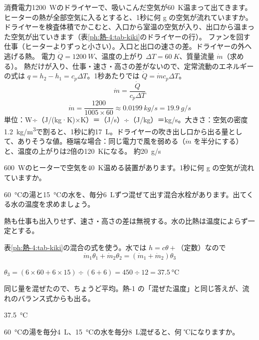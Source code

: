 \begin{phreidai}[ドライヤーを流れる空気の量]
\label{ph:熱-4:ex1}消費電力\qty{1200}{W}のドライヤーで、吸いこんだ空気が\qty{60}{K}温まって出てきます。ヒーターの熱が全部空気に入るとすると、1秒に何 g の空気が流れていますか。
\phbamen
ドライヤーを検査体積でかこむと、入口から室温の空気が入り、出口から温まった空気が出ていきます（表\ref{ph:熱-4:tab-kiki}のドライヤーの行）。
\phmushi
ファンを回す仕事（ヒーターよりずっと小さい）。入口と出口の速さの差。ドライヤーの外へ逃げる熱。
\phzu
電力 $\dot Q=\qty{1200}{W}$、温度の上がり $\Delta T=\qty{60}{K}$、質量流量 $\dot m$（求める）。
\phriyu
熱だけが入り、仕事・速さ・高さの差がないので、定常流動のエネルギーの式は $q=h_2-h_1=c_p\Delta T$。1秒あたりでは $\dot Q=\dot m c_p\Delta T$。
\phtateru
\[ \dot m=\frac{\dot Q}{c_p\Delta T} \]
\phtoku
\[ \dot m=\frac{1200}{1005\times60}\approx\qty{0.0199}{kg/s}=\qty{19.9}{g/s} \]
\phtashikame
単位：W÷（J/(kg·K)×K）＝（J/s）÷（J/kg）＝kg/s。大きさ：空気の密度\qty{1.2}{kg/m^3}で割ると、1秒に約\qty{17}{L}。ドライヤーの吹き出し口から出る量として、ありそうな値。極端な場合：同じ電力で風を弱める（$\dot m$ を半分にする）と、温度の上がりは2倍の\qty{120}{K}になる。
\kotae 約\qty{20}{g/s}
\end{phreidai}
\begin{jibun}
\qty{600}{W}のヒーターで空気を\qty{40}{K}温める装置があります。1秒に何 g の空気が流れていますか。
\end{jibun}

\begin{reidai}[混合水栓の湯の温度]
\label{ph:熱-4:ex2}\qty{60}{\celsius}の湯と\qty{15}{\celsius}の水を、毎分\qty{6}{L}ずつ混ぜて出す混合水栓があります。出てくる水の温度を求めましょう。
\par{} 熱も仕事も出入りせず、速さ・高さの差は無視する。水の比熱は温度によらず一定とする。
\par\kangaekata 表\ref{ph:熱-4:tab-kiki}の混合の式を使う。水では $h=c\theta+$（定数）なので
\[ \dot m_1\theta_1+\dot m_2\theta_2=(\dot m_1+\dot m_2)\theta_3 \]
\par\shiki $\theta_3=(6\times60+6\times15)\div(6+6)=450\div12=\qty{37.5}{\celsius}$
\par{} 同じ量を混ぜたので、ちょうど平均。熱-1 の「混ぜた温度」と同じ答えが、流れのバランス式からも出る。
\par\kotae \qty{37.5}{\celsius}
\end{reidai}
\begin{jibun}
\qty{60}{\celsius}の湯を毎分\qty{4}{L}、\qty{15}{\celsius}の水を毎分\qty{8}{L}混ぜると、何 ℃になりますか。
\end{jibun}

